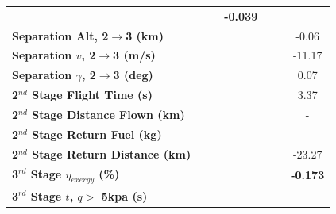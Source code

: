 \begin{table}[ht]
\begin{tabular}{l c c c c c c}
		& \textbf{\secondExergyEffCdOneHundredFive}
		& \textbf{\secondExergyEffCdOneHundredTen}
		& \textbf{-0.039}
		\\
		\textbf{Separation Alt, 2$\rightarrow$3 (km)}
		& \secondthirdSeparationAltCdNinety
		& \secondthirdSeparationAltCdNinetyFive
		& \secondthirdSeparationAltCdStandard
		& \secondthirdSeparationAltCdOneHundredFive
		& \secondthirdSeparationAltCdOneHundredTen
		&-0.06
		\\
		\textbf{Separation $v$, 2$\rightarrow$3 (m/s)}
		& \secondthirdSeparationvCdNinety
		& \secondthirdSeparationvCdNinetyFive
		& \secondthirdSeparationvCdStandard
		& \secondthirdSeparationvCdOneHundredFive
		& \secondthirdSeparationvCdOneHundredTen
		&-11.17
		\\
		\textbf{Separation $\gamma$, 2$\rightarrow$3 (deg)}
		& \secondthirdSeparationgammaCdNinety
		& \secondthirdSeparationgammaCdNinetyFive
		& \secondthirdSeparationgammaCdStandard
		& \secondthirdSeparationgammaCdOneHundredFive
		& \secondthirdSeparationgammaCdOneHundredTen
		&0.07
		\\
		\textbf{2$^{nd}$ Stage Flight Time (s)}
		& \secondFlightTimeCdNinety
		& \secondFlightTimeCdNinetyFive
		& \secondFlightTimeCdStandard
		& \secondFlightTimeCdOneHundredFive
		& \secondFlightTimeCdOneHundredTen
		&3.37
		\\
		\textbf{2$^{nd}$ Stage Distance Flown (km)}
		& \SecondDistCdNinety
		& \SecondDistCdNinetyFive
		& \SecondDistCdStandard
		& \SecondDistCdOneHundredFive
		& \SecondDistCdOneHundredTen
		& -
		\\
		\textbf{2$^{nd}$ Stage Return Fuel (kg)}
		& \returnFuelCdNinety
		& \returnFuelCdNinetyFive
		& \returnFuelCdStandard
		& \returnFuelCdOneHundredFive
		& \returnFuelCdOneHundredTen
		& -
		\\
		\textbf{2$^{nd}$ Stage Return Distance (km)}
		& \returnDistCdNinety
		& \returnDistCdNinetyFive
		& \returnDistCdStandard
		& \returnDistCdOneHundredFive
		& \returnDistCdOneHundredTen
		&-23.27
		\\
		\hline 
		\textbf{3$^{rd}$ Stage $\eta_{exergy}$ (\%)}
		& \textbf{\thirddExergyEffCdNinety}
		& \textbf{\thirddExergyEffCdNinetyFive}
		& \textbf{\thirddExergyEffCdStandard}
		& \textbf{\thirddExergyEffCdOneHundredFive}
		& \textbf{\thirddExergyEffCdOneHundredTen}
		& \textbf{-0.173}
		\\
		\textbf{3$^{rd}$ Stage $t$, $q >$ 5kpa (s)}
		& \thirdqOverFiveCdNinety
		& \thirdqOverFiveCdNinetyFive
		& \thirdqOverFiveCdStandard
		& \thirdqOverFiveCdOneHundredFive
		& \thirdqOverFiveCdOneHundredTen

\end{tabular}
\end{table}
